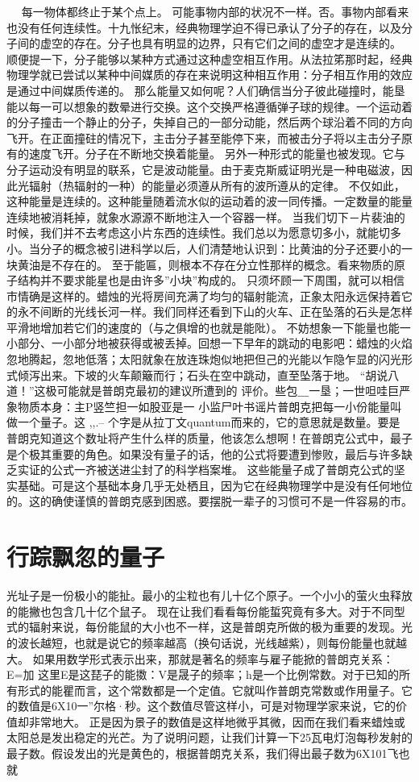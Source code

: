   
每一物体都终止于某个点上。
可能事物内部的状况不一样。否。事物内部看来也没有任何连续性。十九怅纪末，经典物理学迫不得已承认了分子的存在，以及分子间的虚空的存在。分子也具有明显的边界，只有它们之间的虚空才是连续的。
顺便提一下，分子能够以某种方式通过这种虚空相互作用。从法拉笫那时起，经典物理学就已尝试以某种中间媒质的存在来说明这种相互作用：分子相互作用的效应是通过中间媒质传递的。
那么能量又如何呢？人们确信当分子彼此碰撞时，能垦能以每一可以想象的数晕进行交换。这个交换严格遵循弹子球的规律。一个运动着的分子撞击一个静止的分子，失掉自己的一部分动能，然后两个球沿着不同的方向飞开。在正面撞砫的情况下，主击分子甚至能停下来，而被击分子将以主击分子原有的速度飞开。分子在不断地交换着能量。
另外一种形式的能量也被发现。它与分子运动没有明显的联系，它是波动能量。由于麦克斯威证明光是一种电磁波，因此光辐射（热辐射的一种）的能量必须遵从所有的波所遵从的定律。
不仅如此，这种能量是连续的。这种能量随着流水似的运动着的波一同传播。一定数量的能量连续地被消耗掉，就象水源源不断地注入一个容器一样。
当我们切下－片裴油的时候，我们并不去考虑这小片东西的连续性。我们总以为愿意切多小，就能切多小。当分子的概念被引进科学以后，人们清楚地认识到：比黄油的分子还要小的一块黄油是不存在的。
至于能匾，则根本不存在分立性那样的概念。看来物质的原子结构并不要求能星也是由许多”小块”构成的。
只须坏顾一下周围，就可以相信市情确是这样的。蜡烛的光将房间充满了均匀的辐射能流，正象太阳永远保持着它的永不间断的光线长河一样。我们同样还看到下山的火车、正在坠落的石头是怎样平滑地增加若它们的速度的（与之俱增的也就是能阰）。
不妨想象一下能量也能一小部分、一小部分地被获得或被丢掉。回想一下早年的跳动的电影吧：蜡烛的火焰忽地腾起，忽地低落；太阳就象在放连珠炮似地把但己的光能以乍隐乍显的闪光形式倾泻出来。下坡的火车颠簸而行；石头在空中跳动，直至坠落于地。
“胡说八道！”这极可能就是普朗克最初的建议所遭到的
评价。些包＿一垦；一世呾哇巨严象物质本身：主P竖竺担一如股亚是一
小监尸叶书谣片普朗克把每一小份能量叫做一个量子。这
,,.--
个字是从拉丁文quantum而来的，它的意思就是数量。要是
普朗克知道这个数址将产生什么样的质量，他该怎么想啊！在普朗克公式中，最子是个极其重要的角色。如果没有量子的话，他的公式将要遭到惨败，最后与许多缺乏实证的公式一齐被送进尘封了的科学档案堆。
这些能量子成了普朗克公式的坚实基础。可是这个基础本身几乎无处栖且，因为它在经典物理学中是没有任何地位的。这的确使谨慎的普朗克感到困惑。要摆脱一辈子的习惯可不是一件容易的市。

\section{行踪飘忽的量子}

光址子是一份极小的能扯。最小的尘粒也有儿十亿个原子。一个小小的萤火虫释放的能撇也包含几十亿个鼠子。
现在让我们看看每份能蜇究竟有多大。对于不同型式的辐射来说，每份能鼠的大小也不一样，这是普朗克所做的极为重要的发现。光的波长越短，也就是说它的频率越高（换句话说，光线越紫），则每份能量也就越大。
如果用数学形式表示出来，那就是著名的频率与雇子能掀的普朗克关系：
E=加
这里E是这琵子的能擞：V是晟子的频率；h是一个比例常数。对于已知的所有形式的能瞿而言，这个常数都是一个定值。它就叫作普朗克常数或作用量子。它的数值是6X10一”尔格·秒。这个数值尽管这样小，可是对物理学家来说，它的价值却非常地大。
正是因为景子的数值是这样地微乎其微，因而在我们看来蜡烛或太阳总是发出稳定的光芒。为了说明问题，让我们计算一下25瓦电灯泡每秒发射的最子数。假设发出的光是黄色的，根据普朗克关系，我们得出最子数为6X101飞也就

